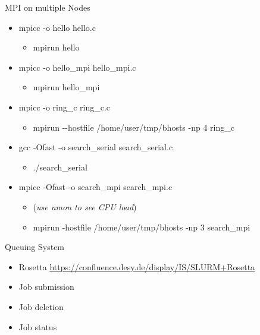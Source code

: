 \documentclass[ignorenonframetext,]{beamer}
\providecommand{\tightlist}{%
  \setlength{\itemsep}{0pt}\setlength{\parskip}{0pt}}
\begin{document}
\begin{frame}{MPI on multiple Nodes}

\begin{itemize}
\tightlist
\item
  mpicc -o hello hello.c

  \begin{itemize}
  \tightlist
  \item
    mpirun hello
  \end{itemize}

\item
  mpicc -o hello\_mpi hello\_mpi.c

  \begin{itemize}
  \tightlist
  \item
    mpirun hello\_mpi
  \end{itemize}

\item
  mpicc -o ring\_c ring\_c.c

  \begin{itemize}
  \tightlist
  \item
    mpirun -\/-hostfile /home/user/tmp/bhosts -np 4 ring\_c
  \end{itemize}

\item
  gcc -Ofast -o search\_serial search\_serial.c

  \begin{itemize}
  \tightlist
  \item
    ./search\_serial
  \end{itemize}

\item
  mpicc -Ofast -o search\_mpi search\_mpi.c

  \begin{itemize}
  \tightlist
  \item
    (\emph{use nmon to see CPU load})
  \item
    mpirun -hostfile /home/user/tmp/bhosts -np 3 search\_mpi
  \end{itemize}

\end{itemize}


\end{frame}

\begin{frame}{Queuing System}

\begin{itemize}
\tightlist
\item
  Rosetta \url{https://confluence.desy.de/display/IS/SLURM+Rosetta}
\item
  Job submission
\item
  Job deletion
\item
  Job status
\end{itemize}


\end{frame}
\end{document}
